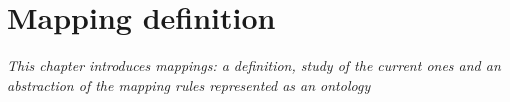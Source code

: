 
\chapter{Mapping definition}
\label{chapter:mappings}

\textit{This chapter introduces mappings: a definition, study of the current ones and an abstraction of the mapping rules represented as an ontology}






